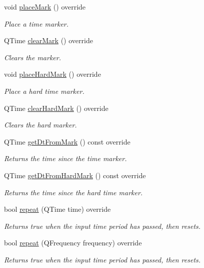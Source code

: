 \begin{DoxyCompactItemize}
void \mbox{\hyperlink{classokapi_1_1ConstantMockTimer_a1d09cc89793c8e35bf788aea68f2bd83}{place\+Mark}} () override
\begin{DoxyCompactList}\small\item\em Place a time marker. \end{DoxyCompactList}\item 
Q\+Time \mbox{\hyperlink{classokapi_1_1ConstantMockTimer_a3647290602451f48b7fb90a80f43b2dd}{clear\+Mark}} () override
\begin{DoxyCompactList}\small\item\em Clears the marker. \end{DoxyCompactList}\item 
void \mbox{\hyperlink{classokapi_1_1ConstantMockTimer_a048c40fb6fc6f2e44d1e47860e4d5402}{place\+Hard\+Mark}} () override
\begin{DoxyCompactList}\small\item\em Place a hard time marker. \end{DoxyCompactList}\item 
Q\+Time \mbox{\hyperlink{classokapi_1_1ConstantMockTimer_a021608c7b88e41faba5efcd44221fcc9}{clear\+Hard\+Mark}} () override
\begin{DoxyCompactList}\small\item\em Clears the hard marker. \end{DoxyCompactList}\item 
Q\+Time \mbox{\hyperlink{classokapi_1_1ConstantMockTimer_aa5272f6e6b833a1921da9710a329f10e}{get\+Dt\+From\+Mark}} () const override
\begin{DoxyCompactList}\small\item\em Returns the time since the time marker. \end{DoxyCompactList}\item 
Q\+Time \mbox{\hyperlink{classokapi_1_1ConstantMockTimer_a9811ae0da08a9f63011ba3226fd65043}{get\+Dt\+From\+Hard\+Mark}} () const override
\begin{DoxyCompactList}\small\item\em Returns the time since the hard time marker. \end{DoxyCompactList}\item 
bool \mbox{\hyperlink{classokapi_1_1ConstantMockTimer_a8f9adcb23b15937ca6d4973b3ee610af}{repeat}} (Q\+Time time) override
\begin{DoxyCompactList}\small\item\em Returns true when the input time period has passed, then resets. \end{DoxyCompactList}\item 
bool \mbox{\hyperlink{classokapi_1_1ConstantMockTimer_acf41646c45b5704842f87e72f0dad9a3}{repeat}} (Q\+Frequency frequency) override
\begin{DoxyCompactList}\small\item\em Returns true when the input time period has passed, then resets. \end{DoxyCompactList}\end{DoxyCompactItemize}
